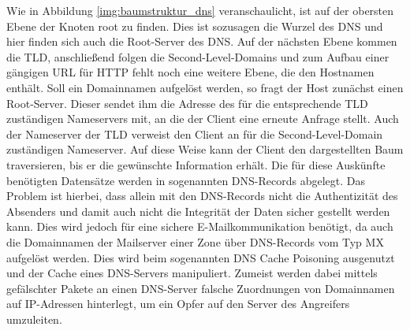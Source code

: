 \documentclass  [paper=a4,
				fontsize=12pt,
				listof=totoc,
				bibliography=totoc
				]{scrreprt}
\begin{document}
		Wie in Abbildung \ref{img:baumstruktur_dns} veranschaulicht, ist auf der obersten Ebene der Knoten \glqq root\grqq{} zu finden.
		Dies ist sozusagen die Wurzel des \ac{DNS} und hier finden sich auch die Root-Server des \ac{DNS}.
		Auf der nächsten Ebene kommen die \ac{TLD}, anschließend folgen die Second-Level-Domains und zum Aufbau einer gängigen \ac{URL} für \ac{HTTP} fehlt noch eine weitere Ebene, die den Hostnamen enthält.
		Soll ein Domainnamen aufgelöst werden, so fragt der Host zunächst einen Root-Server.
		Dieser sendet ihm die Adresse des für die entsprechende \ac{TLD} zuständigen Nameservers mit, an die der Client eine erneute Anfrage stellt.
		Auch der Nameserver der \ac{TLD} verweist den Client an für die Second-Level-Domain zuständigen Nameserver.
		Auf diese Weise kann der Client den dargestellten Baum traversieren, bis er die gewünschte Information erhält.
		Die für diese Auskünfte benötigten Datensätze werden in sogenannten \ac{DNS}-Records abgelegt.
		Das Problem ist hierbei, dass allein mit den \ac{DNS}-Records nicht die Authentizität des Absenders und damit auch nicht die Integrität der Daten sicher gestellt werden kann.
		Dies wird jedoch für eine sichere E-Mailkommunikation benötigt, da auch die Domainnamen der Mailserver einer Zone über \ac{DNS}-Records vom Typ \glqq MX\grqq{} aufgelöst werden.
		Dies wird beim sogenannten \ac{DNS} Cache Poisoning ausgenutzt und der Cache eines \ac{DNS}-Servers manipuliert.
		Zumeist werden dabei mittels gefälschter Pakete an einen \ac{DNS}-Server falsche Zuordnungen von Domainnamen auf \ac{IP}-Adressen hinterlegt, um ein Opfer auf den Server des Angreifers umzuleiten.
		
\end{document}
